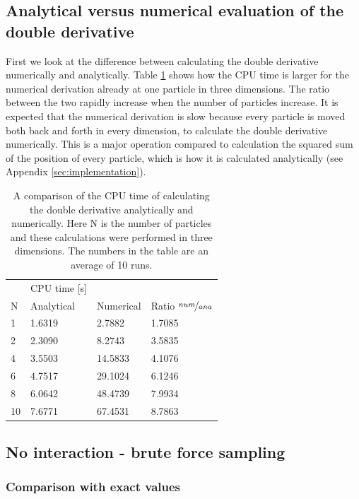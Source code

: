  
 \subsection{Analytical versus numerical evaluation of the double derivative}
 
First we look at the difference between calculating the double derivative numerically and analytically. Table \ref{tab:compare_ana_num} shows how the CPU time is larger for the numerical derivation already at one particle in three dimensions. The ratio between the two rapidly increase when the number of particles increase. It is expected that the numerical derivation is slow because every particle is moved both back and forth in every dimension, to calculate the double derivative numerically. This is a major operation compared to calculation the squared sum of the position of every particle, which is how it is calculated analytically (see Appendix \ref{sec:implementation}).
 
\begin{table}[H]\caption{A comparison of the CPU time of calculating the double derivative analytically and numerically. Here N is the number of particles and these calculations were performed in three dimensions. The numbers in the table are an average of 10 runs.}\label{tab:compare_ana_num}
\center
\begin{tabular}{l|ll|l}
& CPU time [s]&\\
N & Analytical & Numerical & Ratio $\nicefrac{num}{ana}$\\ \hline
1 & 1.6319 & 2.7882 & 1.7085\\
2 & 2.3090 & 8.2743 & 3.5835\\
4 & 3.5503 & 14.5833 & 4.1076\\
6 & 4.7517 & 29.1024 & 6.1246\\
8 & 6.0642 & 48.4739 & 7.9934\\
10 & 7.6771 & 67.4531 & 8.7863\\
\end{tabular}
\end{table}

\subsection{No interaction - brute force sampling}

\subsubsection{Comparison with exact values}

